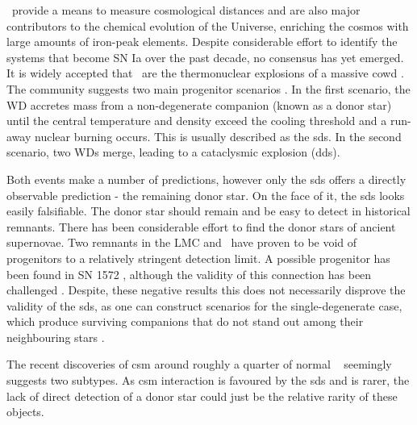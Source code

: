 \documentclass[preprint2]{aastex}
\begin{document}
\sneia\ provide a means to measure cosmological distances and are also major contributors to the chemical evolution of the Universe, enriching the cosmos with large amounts of iron-peak elements. Despite considerable effort to identify the systems that become SN Ia over the past decade, no consensus has yet emerged. It is widely accepted that \sneia\ are the thermonuclear explosions of a massive \gls{cowd} . The community suggests two main progenitor scenarios \cite[for a review see][and references therein]{2012NewAR..56..122W}. In the first scenario, the WD accretes mass from a non-degenerate companion (known as a donor star) until the central temperature and density exceed the cooling threshold and a run-away nuclear burning occurs. This is usually described as the \gls{sds}. In the second scenario, two WDs merge, leading to a cataclysmic explosion (\gls{dds}).

Both events make a number of predictions, however only the \gls{sds} offers a directly observable prediction - the remaining donor star. On the face of it, the \gls{sds} looks easily falsifiable. The donor star should remain \citep[e.g.][]{2000ApJS..128..615M} and be easy to detect in historical remnants. There has been considerable effort \citep{2004Natur.431.1069R, 2009ApJ...691....1G,2009ApJ...701.1665K,2012Natur.481..164S,2012Natur.489..533G,2012arXiv1210.2713K,2012ApJ...759....7K, 2012ApJ...747L..19E} to find the donor stars of ancient supernovae. Two remnants in the LMC and \ have proven to be void of progenitors to a relatively stringent detection limit. A possible progenitor has been found in SN 1572 \citep{2004Natur.431.1069R}, although the validity of this connection has been challenged \citep{2012arXiv1210.2713K}. Despite, these negative results this does not necessarily disprove the validity of the \gls{sds}, as one can construct scenarios for the single-degenerate case, which produce surviving companions that do not stand out among their neighbouring stars \citep[e.g.][]{2012ApJ...760...21P, 2013arXiv1303.2691L, 2003astro.ph..3660P}. 

The recent discoveries of \gls{csm} around roughly a quarter of normal \sneia\ \citep{2007Sci...317..924P, 2009ApJ...702.1157S, 2011Sci...333..856S, 2012ApJ...752..101F} seemingly suggests two subtypes. As \gls{csm} interaction is favoured by the \gls{sds} and is rarer, the lack of direct detection of a donor star could just be the relative rarity of these objects.
\end{document}
